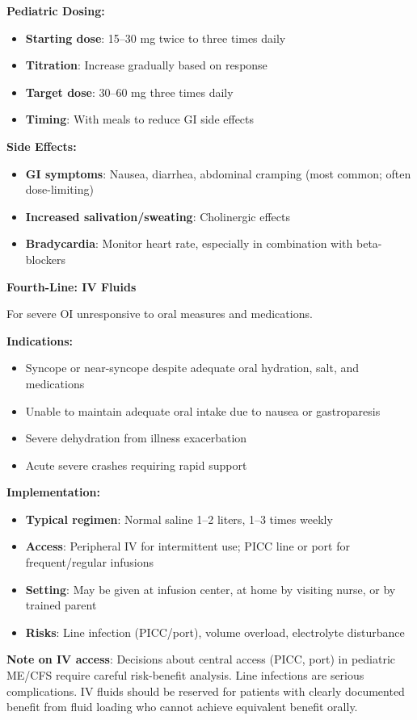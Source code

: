 \begin{protocol}
\textbf{Pediatric Dosing:}
\begin{itemize}
    \item \textbf{Starting dose}: 15--30 mg twice to three times daily
    \item \textbf{Titration}: Increase gradually based on response
    \item \textbf{Target dose}: 30--60 mg three times daily
    \item \textbf{Timing}: With meals to reduce GI side effects
\end{itemize}

\textbf{Side Effects:}
\begin{itemize}
    \item \textbf{GI symptoms}: Nausea, diarrhea, abdominal cramping (most common; often dose-limiting)
    \item \textbf{Increased salivation/sweating}: Cholinergic effects
    \item \textbf{Bradycardia}: Monitor heart rate, especially in combination with beta-blockers
\end{itemize}

\textbf{Fourth-Line: IV Fluids}

For severe OI unresponsive to oral measures and medications.

\textbf{Indications:}
\begin{itemize}
    \item Syncope or near-syncope despite adequate oral hydration, salt, and medications
    \item Unable to maintain adequate oral intake due to nausea or gastroparesis
    \item Severe dehydration from illness exacerbation
    \item Acute severe crashes requiring rapid support
\end{itemize}

\textbf{Implementation:}
\begin{itemize}
    \item \textbf{Typical regimen}: Normal saline 1--2 liters, 1--3 times weekly
    \item \textbf{Access}: Peripheral IV for intermittent use; PICC line or port for frequent/regular infusions
    \item \textbf{Setting}: May be given at infusion center, at home by visiting nurse, or by trained parent
    \item \textbf{Risks}: Line infection (PICC/port), volume overload, electrolyte disturbance
\end{itemize}

\textbf{Note on IV access}: Decisions about central access (PICC, port) in pediatric ME/CFS require careful risk-benefit analysis. Line infections are serious complications. IV fluids should be reserved for patients with clearly documented benefit from fluid loading who cannot achieve equivalent benefit orally.
\end{protocol}


